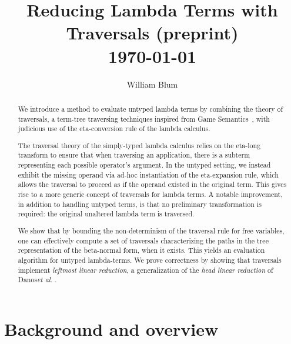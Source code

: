 \documentclass{elsarticle}
\author{William Blum}
\title{Reducing Lambda Terms with Traversals (preprint)
\\ \vspace*{1em}
\today}
\theoremstyle{plain}
\theoremstyle{definition}
\theoremstyle{remark}
\newcommand{\etal}{\textit{et al}. }
\begin{document}
\begin{abstract}
    We introduce a method to evaluate untyped lambda terms by combining the theory of traversals, a term-tree traversing techniques inspired from Game Semantics~\cite{Ong2006,BlumPhd}, with judicious use of the eta-conversion rule of the lambda calculus.

    The traversal theory of the simply-typed lambda calculus relies on the eta-long transform to ensure that when traversing an application, there is a subterm representing each possible operator's argument\cite{BlumPhd, Ong2006}. In the untyped setting, we instead exhibit the missing operand via ad-hoc instantiation of the eta-expansion rule, which allows the traversal to proceed as if the operand existed in the original term. This gives rise to a more generic concept of traversals for lambda terms. A notable improvement, in addition to handling untyped terms, is that no preliminary transformation is required: the original unaltered lambda term is traversed.


    We show that by bounding the non-determinism of the traversal rule for free variables, one can effectively compute a set of traversals characterizing the paths in the tree representation of the beta-normal form, when it exists. This yields an evaluation algorithm for untyped lambda-terms. We prove correctness by showing that traversals implement \emph{leftmost linear reduction}, a generalization of the \emph{head linear reduction} of Danos\etal\cite{danos-head,danosherbelinregnier1996}.
\end{abstract}

\maketitle

\tableofcontents

\section{Background and overview}
\end{document}
